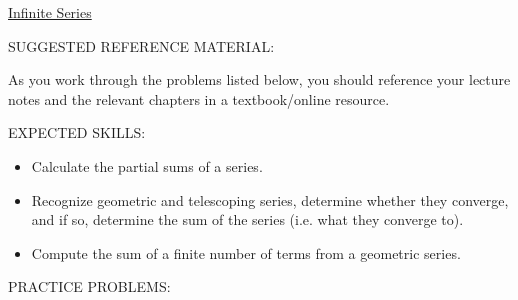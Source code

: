\documentclass[12pt]{article}
\begin{document}
\begin{center}
\underline{\LARGE{Infinite Series}}
\end{center}

\noindent SUGGESTED REFERENCE MATERIAL:

\medskip

\noindent As you work through the problems listed below, you should reference your lecture notes and the relevant chapters in a textbook/online resource.

\bigskip

\noindent EXPECTED SKILLS:

\medskip

\begin{itemize}[topsep=0pt]

\item Calculate the partial sums of a series.

\item Recognize geometric and telescoping series, determine whether they converge, and if so, determine the sum of the series (i.e. what they converge to).

\item Compute the sum of a finite number of terms from a geometric series.

\end{itemize}

\bigskip

\noindent PRACTICE PROBLEMS:

\medskip

\end{document}
